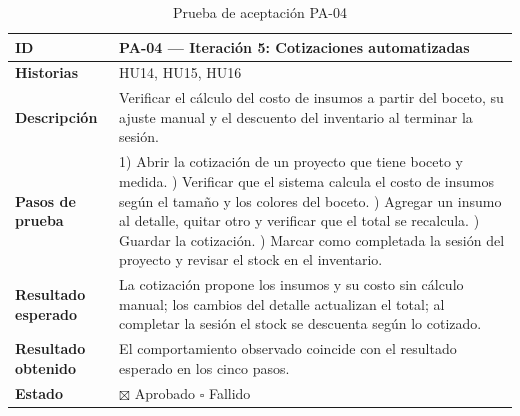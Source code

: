 \documentclass[12pt,letterpaper,oneside]{report}
\begin{document}
\begin{table}[H]
  \centering
  \caption{Prueba de aceptación PA-04}
  \label{tab:pa04anexo}
  \renewcommand{\arraystretch}{1.3}
  \small
  \begin{tabular}{|>{\raggedright\arraybackslash}p{3.6cm}|p{9.4cm}|}
    \hline
    \textbf{ID} & PA-04 — Iteración 5: Cotizaciones automatizadas \\ \hline
    \textbf{Historias} & HU14, HU15, HU16 \\ \hline
    \textbf{Descripción} & Verificar el cálculo del costo de insumos a partir del boceto, su ajuste manual y el descuento del inventario al terminar la sesión. \\ \hline
    \textbf{Pasos de prueba} &
      1) Abrir la cotización de un proyecto que tiene boceto y medida. \newline
      2) Verificar que el sistema calcula el costo de insumos según el tamaño y los colores del boceto. \newline
      3) Agregar un insumo al detalle, quitar otro y verificar que el total se recalcula. \newline
      4) Guardar la cotización. \newline
      5) Marcar como completada la sesión del proyecto y revisar el stock en el inventario. \\ \hline
    \textbf{Resultado esperado} & La cotización propone los insumos y su costo sin cálculo manual; los cambios del detalle actualizan el total; al completar la sesión el stock se descuenta según lo cotizado. \\ \hline
    \textbf{Resultado obtenido} & El comportamiento observado coincide con el resultado esperado en los cinco pasos. \\ \hline
    \textbf{Estado} & $\boxtimes$ Aprobado \qquad $\square$ Fallido \\ \hline
  \end{tabular}
\end{table}
\end{document}
